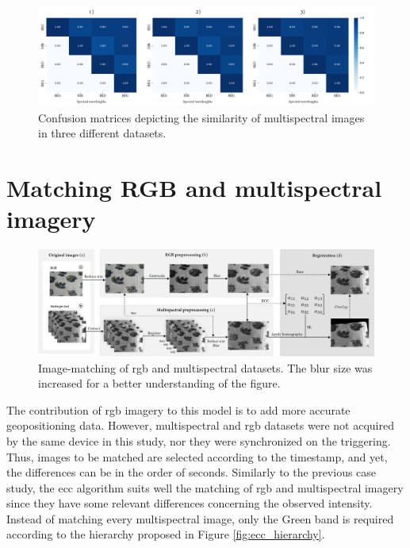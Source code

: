 \begin{figure}
    \centering
    \includegraphics{figs/image_fusion/confusion_matrices.png}
    \caption{Confusion matrices depicting the similarity of multispectral images in three different datasets.}
    \label{fig:multi_band_correlation}
\end{figure}

\section{Matching RGB and multispectral imagery}

\begin{figure}
    \centering
    \includegraphics{figs/image_fusion/multispectral_rgb_registration.png}
    \caption{Image-matching of \acrshort{rgb} and multispectral datasets. The blur size was increased for a better understanding of the figure.}
    \label{fig:rgb_multi_registration}
\end{figure}

The contribution of \acrshort{rgb} imagery to this model is to add more accurate geopositioning data. However, multispectral and \acrshort{rgb} datasets were not acquired by the same device in this study, nor they were synchronized on the triggering. Thus, images to be matched are selected according to the timestamp, and yet, the differences can be in the order of seconds. Similarly to the previous case study, the \acrshort{ecc} algorithm suits well the matching of \acrshort{rgb} and multispectral imagery since they have some relevant differences concerning the observed intensity. Instead of matching every multispectral image, only the Green band is required according to the hierarchy proposed in Figure \ref{fig:ecc_hierarchy}.

